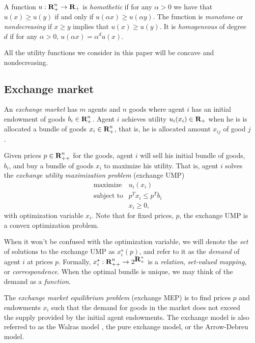 \documentclass[12pt]{article}
\begin{document}
A function $u: {\mbox{\bf R}}^n_+ \to {\mbox{\bf R}}_+$ is \emph{homothetic} if for any $\alpha > 0$ we have that $u(x) \geq u(y)$ if and only if
$u(\alpha x) \geq u(\alpha y)$.
The function is \emph{monotone} or \emph{nondecreasing} if $x \geq y$ implies that $u(x) \geq u(y)$.
It is \emph{homogeneous} of degree $d$ if for any $\alpha > 0$,
$u(\alpha x) = \alpha^d u(x)$.

All the utility functions we consider in this paper will
be concave and nondecreasing.

\subsection{Exchange market}
An \emph{exchange market} has $m$ agents and $n$ goods where
agent $i$ has an initial endowment of goods $b_i \in {\mbox{\bf R}}_+^n$.
Agent $i$ achieves utility $u_i(x_i) \in {\mbox{\bf R}}_+$ when he is is allocated a
bundle of goods $x_i \in {\mbox{\bf R}}^n_{+}$,
that is, he is allocated amount $x_{ij}$ of good $j$.

Given prices $p \in {\mbox{\bf R}}^n_{++}$ for the goods, agent $i$ will sell his
initial bundle of goods, $b_i$, and buy a bundle of goods
$x_i$ to maximize his utility.
That is, agent $i$ solves the \emph{exchange utility maximization problem} (exchange UMP)
\begin{equation}
\label{p-ump}
\begin{array}{ll}
\mbox{maximize} & u_i(x_i) \\
\mbox{subject to} & p^T x_i \leq p^T b_i \\
& x_i \geq 0,
\end{array}
\end{equation}
with optimization variable $x_i$. Note that for fixed prices, $p$, the exchange UMP is a convex optimization problem.

When it won't be confused with the optimization variable,
we will denote the \emph{set} of solutions to the exchange UMP as $x^\star_i(p)$,
and refer to it as the \emph{demand} of agent $i$ at prices $p$.
Formally, $x_i^\star : {\mbox{\bf R}}^n_{++} \to 2^{{\mbox{\bf R}}^n_+}$ is a
\emph{relation}, \emph{set-valued mapping}, or \emph{correspondence}.
When the optimal bundle is unique, we may think of
the demand as a \emph{function}.

The \emph{exchange market equilibrium problem} (exchange MEP) is to find prices $p$ and endowments $x_i$
such that the demand for goods in the market does not exceed the supply
provided by the initial agent endowments.
The exchange model is also referred to as the Walras model \cite{walras1896elements},
the pure exchange model, or the Arrow-Debreu model.
\end{document}
